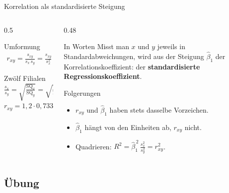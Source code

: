 \documentclass[aspectratio=169,11pt]{beamer}
\newcommand{\SQx}{\text{SQ}_x}
\newcommand{\SQy}{\text{SQ}_y}
\begin{document}
\begin{frame}{Korrelation als standardisierte Steigung}
  \begin{columns}[T]
    \begin{column}{0.5\textwidth}
      \begin{block}{Umformung}
        \vspace{-8pt}
        \begin{align*}
          r_{xy} = \frac{s_{xy}}{s_x\,s_y}
            = \frac{s_{xy}}{s_x^{2}} \cdot \frac{s_x}{s_y}
            = \hat{\beta}_1 \cdot \frac{s_x}{s_y}
        \end{align*}
        \vspace{-12pt}
      \end{block}
      \begin{exampleblock}{Zwölf Filialen}
        $\frac{s_x}{s_y} = \sqrt{\frac{\SQx}{\SQy}} = \sqrt{\frac{155}{288}} = 0{,}7336$\\[3pt]
        $r_{xy} = 1{,}2 \cdot 0{,}7336 = 0{,}8803$ \checkmark
      \end{exampleblock}
    \end{column}
    \begin{column}{0.48\textwidth}
      \begin{block}{In Worten}
        Misst man $x$ und $y$ jeweils in Standardabweichungen, wird aus der
        Steigung $\hat{\beta}_1$ der Korrelationskoeffizient: der
        \textbf{standardisierte Regressionskoeffizient}.
      \end{block}
      \begin{alertblock}{Folgerungen}
        \begin{itemize}
          \item $r_{xy}$ und $\hat{\beta}_1$ haben stets dasselbe Vorzeichen.
          \item $\hat{\beta}_1$ hängt von den Einheiten ab, $r_{xy}$ nicht.
          \item Quadrieren: $R^{2} = \hat{\beta}_1^{\,2}\,\frac{s_x^{2}}{s_y^{2}} = r_{xy}^{2}$.
        \end{itemize}
      \end{alertblock}
    \end{column}
  \end{columns}
\end{frame}

\subsection*{Übung}
\end{document}
